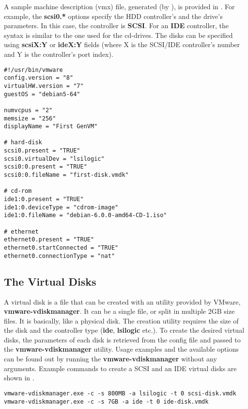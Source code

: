 A sample machine description (vmx) file, generated (by \project), is provided
in . For example, the \textbf{scsi0.*}
options specify the HDD controller's and the drive's parameters. In this case,
the controller is \textbf{SCSI}. For an \textbf{IDE} controller, the syntax is
similar to the one used for the cd-drives. The disks can be specified using
\textbf{scsiX:Y} or \textbf{ideX:Y} fields (where X is the SCSI/IDE
controller's number and Y is the controller's port index).

\lstset{caption=vmx file sample,label=lst:sample-vmx}
\begin{lstlisting}
#!/usr/bin/vmware
config.version = "8"
virtualHW.version = "7"
guestOS = "debian5-64"

numvcpus = "2"
memsize = "256"
displayName = "First GenVM"

# hard-disk
scsi0.present = "TRUE"
scsi0.virtualDev = "lsilogic"
scsi0:0.present = "TRUE"
scsi0:0.fileName = "first-disk.vmdk"

# cd-rom
ide1:0.present = "TRUE"
ide1:0.deviceType = "cdrom-image"
ide1:0.fileName = "debian-6.0.0-amd64-CD-1.iso"

# ethernet
ethernet0.present = "TRUE"
ethernet0.startConnected = "TRUE"
ethernet0.connectionType = "nat"
\end{lstlisting}

\subsection{The Virtual Disks}
\label{sub-sec:vmdk}
A virtual disk is a file that can be created with an utility provided by VMware,
\textbf{vmware-vdiskmanager}. It can be a single file, or split in multiple 2GB
size files. It is basically, like a physical disk. The creation utility
requires the size of the disk and the controller type (\textbf{ide},
\textbf{lsilogic} etc.). To create the desired virtual disks, the parameters of
each disk is retrieved from the config file and passed to the
\textbf{vmware-vdiskmanager} utility. Usage examples and the available options
can be found out by running the \textbf{vmware-vdiskmanager} without any
arguments. Example commands to create a SCSI and an IDE virtual disks are shown in .

\lstset{caption=vmdk creation commands,label=lst:vmware-vdisk}
\begin{lstlisting}
vmware-vdiskmanager.exe -c -s 800MB -a lsilogic -t 0 scsi-disk.vmdk
vmware-vdiskmanager.exe -c -s 7GB -a ide -t 0 ide-disk.vmdk
\end{lstlisting}


